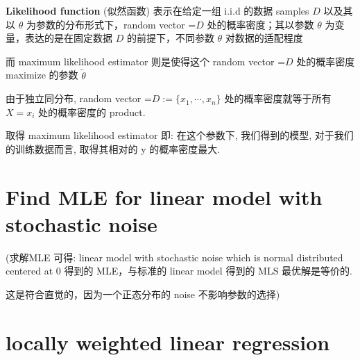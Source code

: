 \documentclass[lang=cn,11pt]{elegantbook}
\begin{document}
\textbf{Likelihood function} (似然函数) 表示在给定一组 i.i.d 的数据
samples \(D\) 以及其以 \(\theta\) 为参数的分布形式下，random vector
=\(D\) 处的概率密度；其以参数 \(\theta\) 为变量，表达的是在固定数据
\(D\) 的前提下，不同参数 \(\theta\) 对数据的适配程度

而 maximum likelihood estimator 则是使得这个 random vector =\(D\)
处的概率密度 maximize 的参数 \(\tilde{\theta}\)

由于独立同分布, random vector =\(D:=\{x_1,\cdots,x_n\}\)
处的概率密度就等于所有 \(X=x_i\) 处的概率密度的 product.

取得 maximum likelihood estimator 即: 在这个参数下, 我们得到的模型,
对于我们的训练数据而言, 取得其相对的 y 的概率密度最大.


\hypertarget{find-mle-for-linear-model-with-stochastic-noise}{%
\section{Find MLE for linear model with stochastic
noise}\label{find-mle-for-linear-model-with-stochastic-noise}}


(求解MLE 可得: linear model with stochastic noise which is normal
distributed centered at 0 得到的 MLE，与标准的 linear model 得到的 MLS
最优解是等价的.

这是符合直觉的，因为一个正态分布的 noise 不影响参数的选择)


\hypertarget{locally-weighted-linear-regression}{%
\section{\texorpdfstring{locally weighted linear regression
}{locally weighted linear regression }}\label{locally-weighted-linear-regression}}

\end{document}
